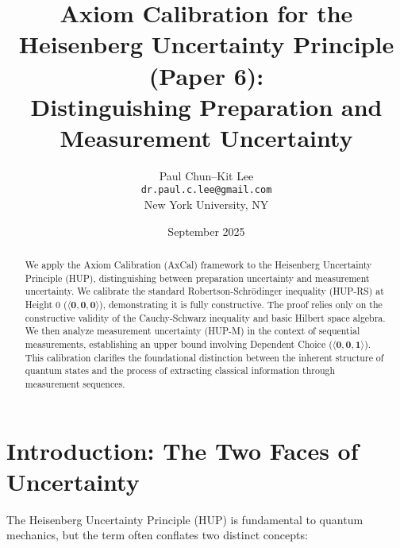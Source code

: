 \documentclass[11pt]{article}
\title{Axiom Calibration for the Heisenberg Uncertainty Principle (Paper 6):\\
Distinguishing Preparation and Measurement Uncertainty}
\author{Paul Chun--Kit Lee\\
\texttt{dr.paul.c.lee@gmail.com}\\
New York University, NY}
\date{September 2025}
\newcommand{\hzero}{\mathbf{0}}
\newcommand{\hone}{\mathbf{1}}
\newcommand{\allzero}{\langle \hzero,\hzero,\hzero\rangle}
\newcommand{\DCwonly}{\langle \hzero,\hzero,\hone\rangle}
\theoremstyle{plain}
\theoremstyle{definition}
\theoremstyle{remark}
\begin{document}
\maketitle

\begin{abstract}
We apply the Axiom Calibration (AxCal) framework to the Heisenberg Uncertainty Principle (HUP), distinguishing between preparation uncertainty and measurement uncertainty. We calibrate the standard Robertson-Schrödinger inequality (HUP-RS) at Height 0 ($\allzero$), demonstrating it is fully constructive. The proof relies only on the constructive validity of the Cauchy-Schwarz inequality and basic Hilbert space algebra. We then analyze measurement uncertainty (HUP-M) in the context of sequential measurements, establishing an upper bound involving Dependent Choice ($\DCwonly$). This calibration clarifies the foundational distinction between the inherent structure of quantum states and the process of extracting classical information through measurement sequences.
\end{abstract}

\tableofcontents

\noindent{}

\section{Introduction: The Two Faces of Uncertainty}

The Heisenberg Uncertainty Principle (HUP) is fundamental to quantum mechanics, but the term often conflates two distinct concepts:
\end{document}
